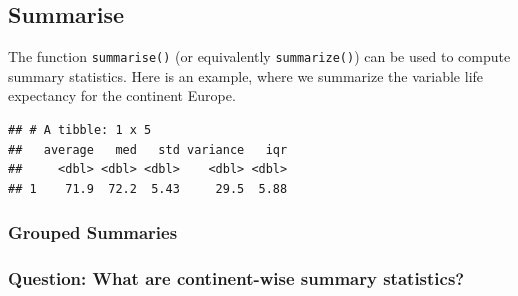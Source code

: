 \documentclass[11pt,]{article}
\newenvironment{Shaded}{\begin{snugshade}}{\end{snugshade}}
\newcommand{\KeywordTok}[1]{\textcolor[rgb]{0.13,0.29,0.53}{\textbf{#1}}}
\newcommand{\DataTypeTok}[1]{\textcolor[rgb]{0.13,0.29,0.53}{#1}}
\newcommand{\StringTok}[1]{\textcolor[rgb]{0.31,0.60,0.02}{#1}}
\newcommand{\OperatorTok}[1]{\textcolor[rgb]{0.81,0.36,0.00}{\textbf{#1}}}
\newcommand{\NormalTok}[1]{#1}
\begin{document}
\subsection{Summarise}\label{summarise}

The function \texttt{summarise()} (or equivalently \texttt{summarize()})
can be used to compute summary statistics. Here is an example, where we
summarize the variable life expectancy for the continent Europe.

\begin{Shaded}
\end{Shaded}

\begin{verbatim}
## # A tibble: 1 x 5
##   average   med   std variance   iqr
##     <dbl> <dbl> <dbl>    <dbl> <dbl>
## 1    71.9  72.2  5.43     29.5  5.88
\end{verbatim}

\subsubsection{Grouped Summaries}\label{grouped-summaries}

\subsubsection{Question: What are continent-wise summary
statistics?}\label{question-what-are-continent-wise-summary-statistics}

\begin{Shaded}
\end{Shaded}
\end{document}
